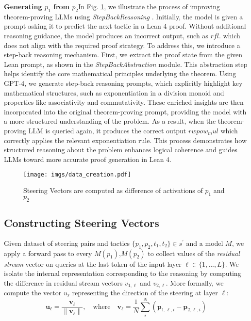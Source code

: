 \textbf{Generating \( p_1 \) from \( p_2 \)}\quad In Fig. \ref{fig:data_creation}, we illustrate the process of improving theorem-proving LLMs using \textit{StepBackReasoning} \cite{zheng2024stepbackevokingreasoning}. Initially, the model is given a prompt asking it to predict the next tactic in a Lean 4 proof. Without additional reasoning guidance, the model produces an incorrect output, such as $rfl$. which does not align with the required proof strategy. To address this, we introduce a step-back reasoning mechanism. First, we extract the proof state from the given Lean prompt, as shown in the \textit{StepBackAbstraction} module. This abstraction step helps identify the core mathematical principles underlying the theorem. Using GPT-4, we generate step-back reasoning prompts, which explicitly highlight key mathematical structures, such as exponentiation in a division monoid and properties like associativity and commutativity. These enriched insights are then incorporated into the original theorem-proving prompt, providing the model with a more structured understanding of the problem. As a result, when the theorem-proving LLM is queried again, it produces the correct output $rw pow_mul$ which correctly applies the relevant exponentiation rule. This process demonstrates how structured reasoning about the problem enhances logical coherence and guides LLMs toward more accurate proof generation in Lean 4.
\begin{figure}[h]
    \centering
    \texttt{[image: imgs/data\_creation.pdf]}
    \caption{Steering Vectors are computed as difference of activations of $p_{1}$ and $p_{2}$}
    \label{fig:data_creation}
\end{figure}



\subsection{Constructing Steering Vectors}
Given dataset of steering pairs and tactics $\{p_1, p_2, t_1, t_2\} \in s^{\prime}$ and a model $M$, we apply a forward pass to every $M(p_1)$,$M(p_2)$ to collect values of the \textit{residual stream} vector on queries at the last token of the input layer $\ell \in \{1,...,L\}$. We isolate the internal representation corresponding to the reasoning by computing the difference in residual stream vectors $v_{1,\ell}$ and $v_{2,\ell}$. More formally, we compute the vector $u_\ell$ representing the direction of the steering at layer $\ell$:
\[
\mathbf{u}_\ell = \frac{\mathbf{v}_\ell}{\|\mathbf{v}_\ell\|}, \quad \text{where} \quad \mathbf{v}_\ell = \frac{1}{N} \sum_{i}^{N} \left( \mathbf{p}_{1,\ell,i} - \mathbf{p}_{2,\ell,i} \right)
\]

